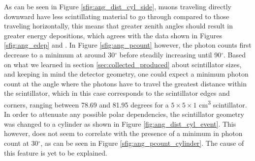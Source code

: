 
As can be seen in Figure \ref{sfig:ang_dist_cyl_side}, muons traveling directly downward have less scintillating material to go through compared to those traveling horizontally, this means that greater zenith angles should result in greater energy depositions, which agrees with the data shown in Figures \ref{sfig:ang_edep} and . In Figure \ref{sfig:ang_pcount} however, the photon counts first decrease to a minimum at around 30$^\circ$ before steadily increasing until 90$^\circ$. Based on what we learned in section \ref{sec:collected_produced} about scintillator sizes, and keeping in mind the detector geometry, one could expect a minimum photon count at the angle where the photons have to travel the greatest distance within the scintillator, which in this case corresponds to the scintillator edges and corners, ranging between 78.69 and 81.95 degrees for a $5\times5\times1$ \unit{\cm\cubed} scintillator. In order to attenuate any possible polar dependencies, the scintillator geometry was changed to a cylinder as shown in Figure \ref{fig:ang_dist_cyl_event}. This however, does not seem to correlate with the presence of a minimum in photon count at 30$^\circ$, as can be seen in Figure \ref{sfig:ang_pcount_cylinder}. The cause of this feature is yet to be explained.

